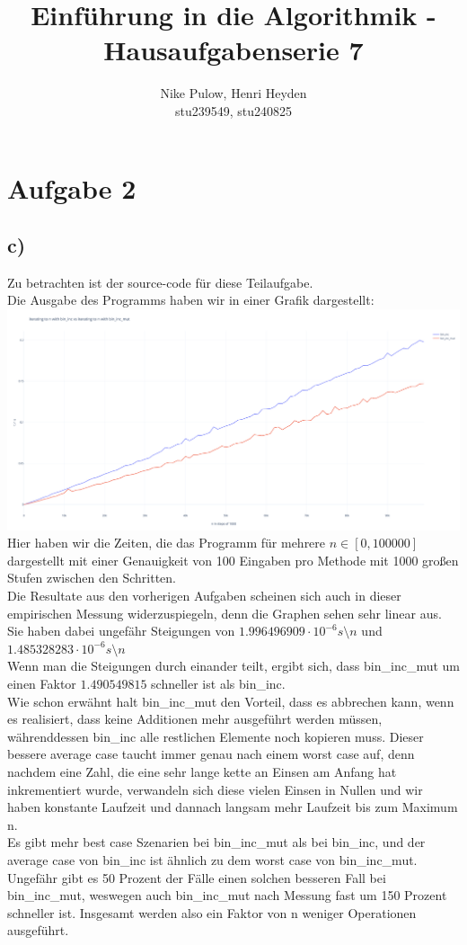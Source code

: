 \documentclass[12pt, a4paper]{article}
\title{Einführung in die Algorithmik - Hausaufgabenserie 7}
\author{Nike Pulow, Henri Heyden\\ \small stu239549, stu240825}
\date{}
\begin{document}
\maketitle
\section*{Aufgabe 2}
\subsection*{c)}
Zu betrachten ist der source-code für diese Teilaufgabe. \\
Die Ausgabe des Programms haben wir in einer Grafik dargestellt:\\
\includegraphics[width=\textwidth]{DiagramFor7.2.png}
Hier haben wir die Zeiten, die das Programm für mehrere \(n \in [0, 100000]\) dargestellt mit einer Genauigkeit von 100 Eingaben pro Methode mit 1000 großen Stufen zwischen den Schritten. \\
Die Resultate aus den vorherigen Aufgaben scheinen sich auch in dieser empirischen Messung widerzuspiegeln, denn die Graphen sehen sehr linear aus. \\
Sie haben dabei ungefähr Steigungen von \( 1.996496909 \cdot 10^{-6} s\setminus n\) und \( 1.485328283 \cdot 10^{-6} s\setminus n\) \\
Wenn man die Steigungen durch einander teilt, ergibt sich, dass bin\_inc\_mut um einen Faktor \( 1.490549815 \) schneller ist als bin\_inc. \\
Wie schon erwähnt halt bin\_inc\_mut den Vorteil, dass es abbrechen kann, wenn es realisiert, dass keine Additionen mehr ausgeführt werden müssen, währenddessen bin\_inc alle restlichen Elemente noch kopieren muss. Dieser bessere average case taucht immer genau nach einem worst case auf, denn nachdem eine Zahl, die eine sehr lange kette an Einsen am Anfang hat inkrementiert wurde, verwandeln sich diese vielen Einsen in Nullen und wir haben konstante Laufzeit und dannach langsam mehr Laufzeit bis zum Maximum n. \\
Es gibt mehr best case Szenarien bei bin\_inc\_mut als bei bin\_inc, und der average case von bin\_inc ist ähnlich zu dem worst case von bin\_inc\_mut. Ungefähr gibt es 50 Prozent der Fälle einen solchen besseren Fall bei bin\_inc\_mut, weswegen auch bin\_inc\_mut nach Messung fast um 150 Prozent schneller ist.
Insgesamt werden also ein Faktor von n weniger Operationen ausgeführt.
\end{document}
